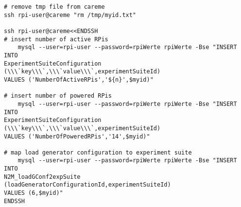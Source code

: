 \begin{verbatim}
# remove tmp file from careme                                                                                                                                               
ssh rpi-user@careme "rm /tmp/myid.txt"

ssh rpi-user@careme<<ENDSSH                                                                                                                                                 
# insert number of active RPis                                                                                                                                              
	mysql --user=rpi-user --password=rpiWerte rpiWerte -Bse "INSERT INTO 
ExperimentSuiteConfiguration (\\\`key\\\`,\\\`value\\\`,experimentSuiteId) 
VALUES ('NumberOfActiveRPis','${n}',$myid)"                                                                                                                                                            
                                                                                                                                                                            
# insert number of powered RPis                                                                                                                                             
	mysql --user=rpi-user --password=rpiWerte rpiWerte -Bse "INSERT INTO 
ExperimentSuiteConfiguration (\\\`key\\\`,\\\`value\\\`,experimentSuiteId) 
VALUES ('NumberOfPoweredRPis','14',$myid)"                                                                                                                                                             
                                                                                                                                                                            
# map load generator configuration to experiment suite                                                                                                                      
	mysql --user=rpi-user --password=rpiWerte rpiWerte -Bse "INSERT INTO 
N2M_loadGConf2expSuite (loadGeneratorConfigurationId,experimentSuiteId) 
VALUES (6,$myid)"              
ENDSSH


\end{verbatim}
